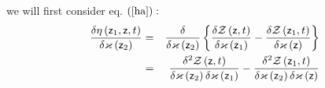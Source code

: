 we will first consider eq. $\left( \ref{ha}\right) :$%
\begin{eqnarray}
\frac{\delta \eta \left( {\sf z}_{1},{\sf z},t\right) }{\delta \varkappa
\left( {\sf z}_{2}\right) } &=&\frac{\delta }{\delta \varkappa \left( {\sf z}%
_{2}\right) }\left\{ \frac{\delta {\cal Z}\left( {\sf z},t\right) }{\delta
\varkappa \left( {\sf z}_{1}\right) }-\frac{\delta {\cal Z}\left( {\sf z}%
_{1},t\right) }{\delta {\cal \varkappa }\left( {\sf z}\right) }\right\}  \\
&=&\frac{\delta ^{2}{\cal Z}\left( {\sf z},t\right) }{\delta \varkappa
\left( {\sf z}_{2}\right) \delta \varkappa \left( {\sf z}_{1}\right) }-\frac{%
\delta ^{2}{\cal Z}\left( {\sf z}_{1},t\right) }{\delta \varkappa \left( 
{\sf z}_{2}\right) \delta \varkappa \left( {\sf z}\right) }
\end{eqnarray}%
